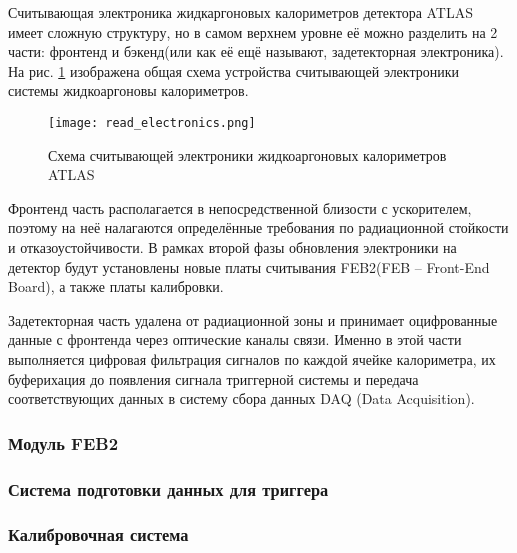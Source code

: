 Считывающая электроника жидкаргоновых калориметров детектора ATLAS имеет сложную структуру, но в самом верхнем уровне её можно разделить на 2 части: фронтенд и бэкенд(или как её ещё называют, задетекторная электроника). На рис. \ref{fig:read_electronics} изображена общая схема устройства считывающей электроники системы жидкоаргоновы калориметров.
\begin{figure}[ht]
    \centering
    \texttt{[image: read\_electronics.png]}
    \caption{Схема считывающей электроники жидкоаргоновых калориметров ATLAS}
    \label{fig:read_electronics}
\end{figure}\par
Фронтенд часть располагается в непосредственной близости с ускорителем, поэтому на неё налагаются определённые требования по радиационной стойкости и отказоустойчивости. В рамках второй фазы обновления электроники на детектор будут установлены новые платы считывания FEB2(FEB -- Front-End Board), а также платы калибровки.\par
Задетекторная часть удалена от радиационной зоны и принимает оцифрованные данные с фронтенда через оптические каналы связи. Именно в этой части выполняется цифровая фильтрация сигналов по каждой ячейке калориметра, их буферихация до появления сигнала триггерной системы и передача соответствующих данных в систему сбора данных DAQ (Data Acquisition).\par

\subsubsection{Модуль FEB2}


\subsubsection{Система подготовки данных для триггера}


\subsubsection{Калибровочная система}


